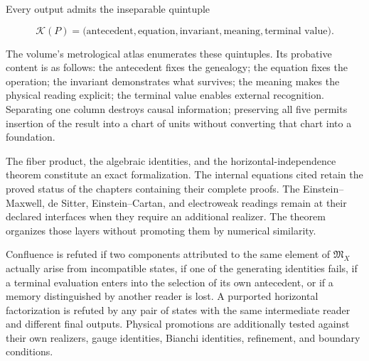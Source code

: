 Every output admits the inseparable quintuple

\begin{equation}
 \mathcal K(P)=
 \bigl(
 \text{antecedent},
 \text{equation},
 \text{invariant},
 \text{meaning},
 \text{terminal value}
 \bigr).
 \label{rm:eq:confluence-quintuple}
\end{equation}

The volume's metrological atlas enumerates these quintuples. Its
probative content is as follows: the antecedent fixes the genealogy; the equation
fixes the operation; the invariant demonstrates what survives; the meaning
makes the physical reading explicit; the terminal value enables external
recognition. Separating one column destroys causal information; preserving all
five permits insertion of the result into a chart of units without converting
that chart into a foundation.

\begin{proofstatusbox}
The fiber product, the algebraic identities, and the horizontal-independence theorem constitute an exact formalization. The internal equations cited retain the proved status of the chapters containing their complete proofs. The Einstein--Maxwell, de Sitter, Einstein--Cartan, and electroweak readings remain at their declared interfaces when they require an additional realizer. The theorem organizes those layers without promoting them by numerical similarity.
\end{proofstatusbox}

\begin{falsifierbox}
Confluence is refuted if two components attributed to the same element of \(\mathfrak M_X\) actually arise from incompatible states, if one of the generating identities fails, if a terminal evaluation enters into the selection of its own antecedent, or if a memory distinguished by another reader is lost. A purported horizontal factorization is refuted by any pair of states with the same intermediate reader and different final outputs. Physical promotions are additionally tested against their own realizers, gauge identities, Bianchi identities, refinement, and boundary conditions.
\end{falsifierbox}
